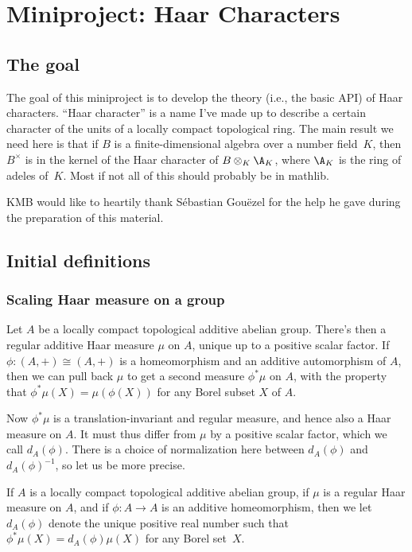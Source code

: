 \chapter{Miniproject: Haar Characters}\label{Haar_char_project}

\section{The goal}

The goal of this miniproject is to develop the theory (i.e., the basic API) of Haar characters.
``Haar character'' is a name I've made up to describe a certain character of the units of a locally
compact topological ring. The main result we need here is that if $B$ is a finite-dimensional
algebra over a number field~$K$, then $B^\times$ is in the kernel of the Haar character
of $B\otimes_K\A_K$, where $\A_K$ is the ring of adeles of~$K$. Most if not all of this
should probably be in mathlib.

KMB would like to heartily thank S\'ebastian Gou\"ezel for the help he gave during the preparation
of this material.

\section{Initial definitions}

\subsection{Scaling Haar measure on a group}

Let $A$ be a locally compact topological additive abelian group. There's then a regular additive
Haar measure $\mu$ on $A$, unique up to a positive scalar factor. If $\phi:(A,+)\cong(A,+)$ is a
homeomorphism and an additive automorphism of $A$, then we can pull back $\mu$
to get a second measure $\phi^*\mu$ on $A$, with the property that
$\phi^*\mu(X)=\mu(\phi(X))$ for any Borel subset $X$ of $A$.

Now $\phi^*\mu$ is a translation-invariant and regular measure,
and hence also a Haar measure on $A.$ It must thus differ from
$\mu$ by a positive scalar factor, which we call $d_A(\phi)$.
There is a choice of normalization here between $d_A(\phi)$
and $d_A(\phi)^{-1}$, so let us be more precise.

\begin{definition}
  \label{MeasureTheory.addEquivAddHaarChar}
  If $A$ is a locally compact topological additive abelian group,
  if $\mu$ is a regular Haar measure on $A$, and if $\phi:A\to A$ is an
  additive homeomorphism, then we let $d_A(\phi)$ denote the unique positive
  real number such that $\phi^*\mu(X)=d_A(\phi)\mu(X)$ for any Borel set~$X$.
\end{definition}


